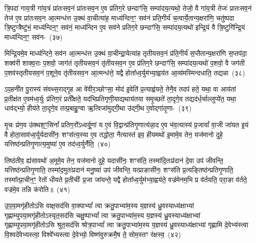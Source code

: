 त्रि॒पदा॑ गाय॒त्री गा॑य॒त्रं प्रा॑तःसव॒नं प्रा॑तःसव॒न ए॒व प्र॑तिग॒रे छन्दाꣳ॑सि॒ सम्पा॑दय॒त्यथो॒ तेजो॒ वै गा॑य॒त्री तेजः॑ प्रातःसव॒नं तेज॑ ए॒व प्रा॑तःसव॒न आ॒त्मन्ध॑त्त उ॒क्थं वा॒चीत्या॑ह॒ माध्य॑न्दिन॒ꣳ॒ सव॑नं प्रति॒गीर्य॑ च॒त्वार्ये॒तान्य॒क्षरा॑णि॒ चतु॑ष्पदा त्रि॒ष्टुप्त्रैष्टु॑भं॒ माध्य॑न्दिन॒ꣳ॒ सव॑नं॒ माध्य॑न्दिन ए॒व सव॑ने प्रतिग॒रे छन्दाꣳ॑सि॒ सम्पा॑दय॒त्यथो॑ इन्द्रि॒यं वै त्रि॒ष्टुगि॑न्द्रि॒यं माध्य॑न्दिन॒ꣳ॒ सव॑न-~(३७)

मिन्द्रि॒यमे॒व माध्य॑न्दिने॒ सव॑न आ॒त्मन्ध॑त्त उ॒क्थं वा॒चीन्द्रा॒येत्या॑ह तृतीयसव॒नं प्र॑ति॒गीर्य॑ स॒प्तैतान्य॒क्षरा॑णि स॒प्तप॑दा॒ शक्व॑री शाक्व॒राः प॒शवो॒ जाग॑तं तृतीयसव॒नं तृ॑तीयसव॒न ए॒व प्र॑तिग॒रे छन्दाꣳ॑सि॒ सम्पा॑दय॒त्यथो॑ प॒शवो॒ वै जग॑ती प॒शव॑स्तृतीयसव॒नं प॒शूने॒व तृ॑तीयसव॒न आ॒त्मन्ध॑त्ते॒ यद्वै होता᳚ध्व॒र्युम॑भ्या॒ह्वय॑त आ॒व्य॑मस्मिन्दधाति॒ तद्यन्ना~(३८)

ऽप॒हनी॑त पु॒रास्य॑ संवथ्स॒राद्गृ॒ह आ वे॑वीर॒ञ्छोꣳसा॒ मोद॑ इ॒वेति॑ प्र॒त्याह्व॑यते॒ तेनै॒व तदप॑ हते॒ यथा॒ वा आय॑तां प्र॒तीक्ष॑त ए॒वम॑ध्व॒र्युः प्र॑तिग॒रं प्रती᳚क्षते॒ यद॑भिप्रतिगृणी॒याद्यथाय॑तया समृ॒च्छते॑ ता॒दृगे॒व तद्यद॑र्ध॒र्चाल्लुप्ये॑त॒ यथा॒ धाव॑द्भ्यो॒ हीय॑ते ता॒दृगे॒व तत्प्र॒बाहु॒ग्वा ऋ॒त्विजा॑मुद्गी॒था उ॑द्गी॒थ ए॒वोद्गा॑तृ॒णा-~(३९)

मृ॒चः प्र॑ण॒व उ॑क्थश॒ꣳ॒सिनां᳚ प्रतिग॒रो᳚\-ऽध्वर्यू॒णां य ए॒वं वि॒द्वान्प्र॑तिगृ॒णात्य॑न्ना॒द ए॒व भ॑व॒त्यास्य॑ प्र॒जायां᳚ वा॒जी जा॑यत इ॒यं वै होता॒साव॑ध्व॒र्युर्यदासी॑नः॒ शꣳस॑त्य॒स्या ए॒व तद्धोता॒ नैत्यास्त॑ इव॒ हीयमथो॑ इ॒मामे॒व तेन॒ यज॑मानो दुहे॒ यत्तिष्ठ॑न्प्रतिगृ॒णात्य॒मुष्या॑ ए॒व तद॑ध्व॒र्युर्नैति॒~(४०)

तिष्ठ॑तीव॒ ह्य॑सावथो॑ अ॒मूमे॒व तेन॒ यज॑मानो दुहे॒ यदासी॑नः॒ शꣳस॑ति॒ तस्मा॑दि॒तःप्र॑दानं दे॒वा उप॑ जीवन्ति॒ यत्तिष्ठ॑न्प्रतिगृ॒णाति॒ तस्मा॑द॒मुतः॑प्रदानं मनु॒ष्या॑ उप॑ जीवन्ति॒ यत्प्राङासी॑नः॒ शꣳस॑ति प्र॒त्यङ्तिष्ठ॑न्प्रतिगृ॒णाति॒ तस्मा᳚त्प्रा॒चीन॒ꣳ॒ रेतो॑ धीयते प्र॒तीचीः᳚ प्र॒जा जा॑यन्ते॒ यद्वै होता᳚ध्व॒र्युम॑भ्या॒ह्वय॑ते॒ वज्र॑मेनम॒भि प्र व॑र्तयति॒ परा॒ङा व॑र्तते॒ वज्र॑मे॒व तन्नि क॑रोति॥~(४१)

{\anuvakamend[{सव॑ने॒ वज्र॑म॒न्तर्ध॑त्ते॒ त्रीण्ये॒तान्य॒क्षरा॑णीन्द्रि॒यं माध्य॑न्दिन॒ꣳ॒ सव॑न॒न्नोद्गा॑तृ॒णाम॑ध्व॒र्युर्नैति॑ वर्तयत्य॒ष्टौ च॑}]}%

उ॒प॒या॒मगृ॑हीतो\-ऽसि वाक्ष॒सद॑सि वा॒क्पा\-भ्यां᳚ त्वा क्रतु॒पाभ्या॑म॒स्य य॒ज्ञस्य॑ ध्रु॒वस्याध्य॑क्षाभ्यां गृह्णाम्युपया॒मगृ॑हीतो\-ऽस्यृत॒सद॑सि चक्षु॒ष्पा\-भ्यां᳚ त्वा क्रतु॒पाभ्या॑म॒स्य य॒ज्ञस्य॑ ध्रु॒वस्याध्य॑क्षाभ्यां गृह्णाम्युपया॒मगृ॑हीतो\-ऽसि श्रुत॒सद॑सि श्रोत्र॒पा\-भ्यां᳚ त्वा क्रतु॒पाभ्या॑म॒स्य य॒ज्ञस्य॑ ध्रु॒वस्याध्य॑क्षाभ्यां गृह्णामि दे॒वेभ्य॑स्त्वा वि॒श्वदे॑वेभ्यस्त्वा॒ विश्वे᳚भ्यस्त्वा दे॒वेभ्यो॒ विष्ण॑वुरुक्रमै॒ष ते॒ सोम॒स्तꣳ र॑क्षस्व॒~(४२)

